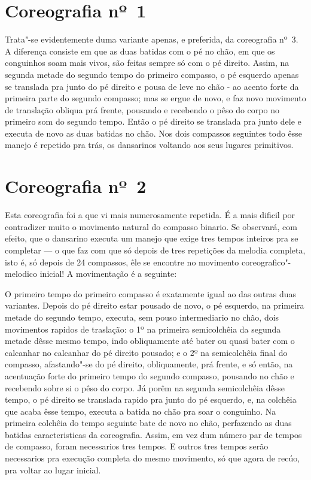 \section{Coreografia nº~1}

Trata"-se evidentemente duma variante apenas, e preferida, da coreografia
nº~3. A diferença consiste em que as duas batidas com o pé no chão, em
que os conguinhos soam mais vivos, são feitas sempre só com o pé
direito. Assim, na segunda metade do segundo tempo do primeiro compasso,
o pé esquerdo apenas se translada pra junto do pé direito e pousa de
leve no chão - ao acento forte da primeira parte do segundo compasso;
mas se ergue de novo, e faz novo movimento de translação obliqua prá
frente, pousando e recebendo o pêso do corpo no primeiro som do segundo
tempo. Então o pé direito se translada pra junto dele e executa de novo
as duas batidas no chão. Nos dois compassos seguintes todo êsse manejo é
repetido pra trás, os dansarinos voltando aos seus lugares primitivos.

\section{Coreografia nº~2}

Esta coreografia foi a que vi mais numerosamente repetida. É a mais
dificil por contradizer muito o movimento natural do compasso binario.
Se observará, com efeito, que o dansarino executa um manejo que exige
tres tempos inteiros pra se completar --- o que faz com que só depois de
tres repetições da melodia completa, isto é, só depois de 24 compassos,
êle se encontre no movimento coreografico"-melodico inicial! A
movimentação é a seguinte:

O primeiro tempo do primeiro compasso é exatamente igual ao das outras
duas variantes. Depois do pé direito estar pousado de novo, o pé
esquerdo, na primeira metade do segundo tempo, executa, sem pouso
intermediario no chão, dois movimentos rapidos de traslação: o 1º na
primeira semicolchêia da segunda metade dêsse mesmo tempo, indo
obliquamente até bater ou quasi bater com o calcanhar no calcanhar do pé
direito pousado; e o 2º na semicolchêia final do compasso, afastando"-se
do pé direito, obliquamente, prá frente, e só então, na acentuação forte
do primeiro tempo do segundo compasso, pousando no chão e recebendo
sobre si o pêso do corpo. Já porêm na segunda semicolchêia dêsse tempo,
o pé direito se translada rapido pra junto do pé esquerdo, e, na
colchêia que acaba êsse tempo, executa a batida no chão pra soar o
conguinho. Na primeira colchêia do tempo seguinte bate de novo no chão,
perfazendo as duas batidas caracteristicas da coreografia. Assim, em vez
dum número par de tempos de compasso, foram necessarios tres tempos. E
outros tres tempos serão necessarios pra execução completa do mesmo
movimento, só que agora de recúo, pra voltar ao lugar inicial.

